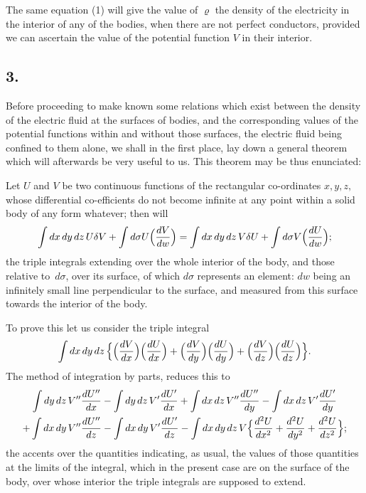 \documentclass[12pt,notitlepage]{amsart}
\newcommand\Section[1]{\subsection{{#1}}}
\renewcommand{\rho}{\varrho}
\begin{document}
The same equation (1) will give the value of $\rho$ the density of the
electricity in the interior of any of the bodies, when there are not perfect
conductors, provided we can ascertain the value of the potential function $V$
in their interior.
\bigskip

\Section{3.}
Before proceeding to make known some relations which exist between
the density of the electric fluid at the surfaces of bodies, and the 
corresponding values of the potential functions
within and without those surfaces, the
electric fluid being confined to them alone, we shall in the first place, lay
down a general theorem which will afterwards be very useful to us. This
theorem may be thus enunciated:

Let $U$ and $V$ be two continuous functions of the rectangular co-ordinates
$x,y,z,$ whose differential co-efficients do not become infinite at any
point within a solid body of any form whatever; then will
\[
\int dx\,dy\,dz\,U\delta V
+\int d\sigma U\Bigl(\frac{dV}{dw}\Bigr)=
\int dx\,dy\,dz\,V\delta U
+\int d\sigma V\Bigl(\frac{dU}{dw}\Bigr);
\]
the triple integrals extending over the whole interior of the body, and those
relative to~$d\sigma$, over its surface,
of which $d\sigma$ represents an element: $dw$ being
an infinitely small line perpendicular to the surface, and measured from this
surface towards the interior of the body.

To prove this let us consider the triple integral
\[
\int dx\,dy\,dz\,
\Bigl\{
  \Bigl(\frac{dV}{dx}\Bigr)\Bigl(\frac{dU}{dx}\Bigr)
  +\Bigl(\frac{dV}{dy}\Bigr)\Bigl(\frac{dU}{dy}\Bigr)
  +\Bigl(\frac{dV}{dz}\Bigr)\Bigl(\frac{dU}{dz}\Bigr)
\Bigr\}.
\]
The method of integration by parts, reduces this to
\begin{multline*}
\int dy\,dz\,V''\frac{dU''}{dx}
-\int dy\,dz\,V'\frac{dU'}{dx}
+\int dx\,dz\,V''\frac{dU''}{dy}
-\int dx\,dz\,V'\frac{dU'}{dy}\\
+\int dx\,dy\,V''\frac{dU''}{dz}
-\int dx\,dy\,V'\frac{dU'}{dz}
-\int dx\,dy\,dz\,V
\Bigl\{\frac{d^2U}{dx^2}+\frac{d^2U}{dy^2}+\frac{d^2U}{dz^2}\Bigr\};
\end{multline*}
the accents over the quantities indicating, as usual, the values of those 
quantities at the limits of the integral,
which in the present case are on the surface
of the body, over whose interior the triple integrals are supposed to extend.
\end{document}
